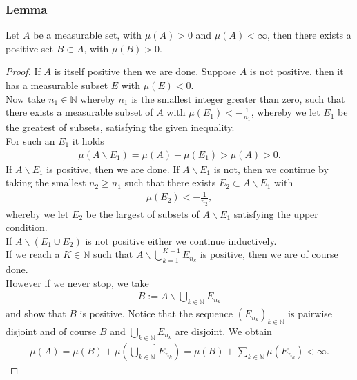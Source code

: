 \documentclass[11pt,a4paper]{article}
\begin{document}
\subsubsection{Lemma}
Let $A$ be a measurable set, with $\mu(A)>0$ and $\mu(A)<\infty$, then there exists a positive set $B\subset{}A$, with $\mu(B)>0$.
\begin{proof}
If $A$ is itself positive then we are done. Suppose $A$ is not positive, then it has a measurable subset $E$ with $\mu(E)<0.$\vspace{1em}\\
Now take $n_1\in\mathbb{N}$ whereby $n_1$ is the smallest integer greater than zero, such that there exists a measurable subset of $A$ with $\mu(E_1)<-\frac{1}{n_1}$, whereby we let $E_1$ be the greatest of subsets, satisfying the given inequality.\vspace{1em}\\ For such an $E_1$ it holds
\begin{align*}
\mu(A\backslash{}E_1) = \mu(A)-\mu(E_1)>\mu(A)>0.
\end{align*}   
If $A\backslash{}E_1$ is positive, then we are done. If $A\backslash{}E_1$ is not, then we continue by taking the smallest $n_2\geq{}n_1$ such that there exists $E_2\subset{}A\backslash{}E_1$ with
\begin{align*}
\mu(E_2)<-\frac{1}{n_2},
\end{align*}  
whereby we let $E_2$ be the largest of subsets of $A\backslash{}E_1$ satisfying the upper condition. \\
If $A\backslash{}\left(E_1\cup{}E_2\right)$ is not positive either we continue inductively. \vspace{1em}\\If we reach a $K\in\mathbb{N}$ such that $A\backslash\bigcup\limits_{k=1}^{K-1}E_{n_k}$ is positive, then we are of course done. \vspace{1em}\\However if we never stop, we take
\begin{align*}
B:=A\backslash{}\bigcup\limits_{k\in\mathbb{N}}E_{n_k}
\end{align*}
and show that $B$ is positive. Notice that the sequence $(E_{n_k})_{k\in\mathbb{N}}$ is pairwise disjoint and of course $B$ and $\bigcup\limits_{k\in\mathbb{N}}E_{n_k}$ are disjoint. We obtain
\begin{align*}
\mu(A)=\mu(B)+\mu\left(\dot{\bigcup\limits_{k\in\mathbb{N}}}E_{n_k}\right) = \mu(B)+\sum\limits_{k\in\mathbb{N}}\mu(E_{n_k})<\infty.
\end{align*}

\end{proof}
\end{document}
